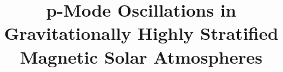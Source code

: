 \documentclass[linenumbers]{aastex63}
\begin{document}
\title{p-Mode Oscillations in Gravitationally Highly Stratified Magnetic Solar Atmospheres}


\end{document}
